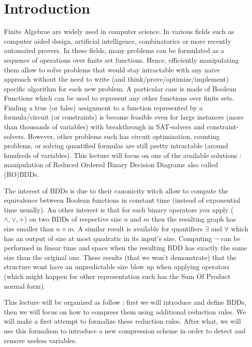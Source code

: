 \documentclass[a4paper,10pt]{article}
\begin{document}
\section{Introduction}
Finite Algebrae are widely used in computer science.
In various fields such as computer aided design, artificial intelligence, combinatorics or more recently automated provers.
In these fields, many problems can be formulated as a sequence of operations over finite set functions. Hence, efficiently manipulating them allow to solve problems that would stay intractable with any naive approach without the need to write (and think/prove/optimize/implement) specific algorithm for each new problem.
A particular case is made of Boolean Functions which can be used to represent any other functions over finite sets.
Finding a true (or false) assignment to a function represented by a formula/circuit (or constraints) is become feasible even for large instances (more than thousands of variables) with breakthrough in SAT-solvers and constraint-solvers.
However, other problems such has circuit optimization, counting problems, or solving quantified formulas are still pretty intractable (around hundreds of variables).
This lecture will focus on one of the available solutions : manipulation of Reduced Ordered Binary Decision Diagrams also called (RO)BDDs.

The interest of BDDs is due to their canonicity witch allow to compute the equivalence between Boolean functions in constant time (instead of exponential time usually).
An other interest is that for each binary operators you apply ($\land, \lor, +$) on two BDDs of respective size $n$ and $m$ then the resulting graph has size smaller than $n\times m$.
A similar result is available for quantifiers $\exists$ and $\forall$ which has an output of size at most quadratic in its input's size.
Computing $\lnot$ can be performed in linear time and space when the resulting BDD has exactly the same size than the original one.
These results (that we won't demonstrate) that the structure wont have an unpredictable size blow up when applying operators (which might happen for other representation such has the Sum Of Product normal form).


This lecture will be organized as follow : first we will introduce and define BDDs, then we will focus on how to compress them using additional reduction rules.
We will make a first attempt to formalize these reduction rules.
After what, we will use this formalism to introduce a new compression scheme in order to detect and remove useless variables.
\end{document}
